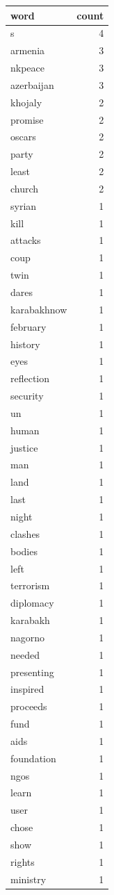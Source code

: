 \begin{tabular}{lr}
\toprule
word & count \\
\midrule
s & 4 \\
armenia & 3 \\
nkpeace & 3 \\
azerbaijan & 3 \\
khojaly & 2 \\
promise & 2 \\
oscars & 2 \\
party & 2 \\
least & 2 \\
church & 2 \\
syrian & 1 \\
kill & 1 \\
attacks & 1 \\
coup & 1 \\
twin & 1 \\
dares & 1 \\
karabakhnow & 1 \\
february & 1 \\
history & 1 \\
eyes & 1 \\
reflection & 1 \\
security & 1 \\
un & 1 \\
human & 1 \\
justice & 1 \\
man & 1 \\
land & 1 \\
last & 1 \\
night & 1 \\
clashes & 1 \\
bodies & 1 \\
left & 1 \\
terrorism & 1 \\
diplomacy & 1 \\
karabakh & 1 \\
nagorno & 1 \\
needed & 1 \\
presenting & 1 \\
inspired & 1 \\
proceeds & 1 \\
fund & 1 \\
aids & 1 \\
foundation & 1 \\
ngos & 1 \\
learn & 1 \\
user & 1 \\
chose & 1 \\
show & 1 \\
rights & 1 \\
ministry & 1 \\
\bottomrule
\end{tabular}
